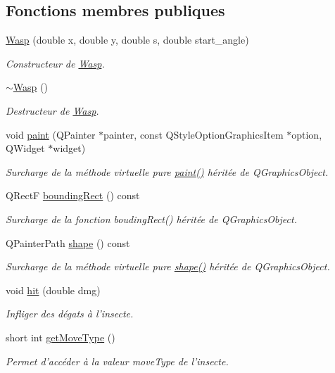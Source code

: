 \subsection*{Fonctions membres publiques}
\begin{DoxyCompactItemize}
\item 
\hyperlink{classWasp_a04c7736d744ab1c36b075f1e98ec93c2}{Wasp} (double x, double y, double s, double start\_\-angle)
\begin{DoxyCompactList}\small\item\em Constructeur de \hyperlink{classWasp}{Wasp}. \end{DoxyCompactList}\item 
\hyperlink{classWasp_ac4b6b3f99b8a044cc2047144f0e44bb1}{$\sim$Wasp} ()
\begin{DoxyCompactList}\small\item\em Destructeur de \hyperlink{classWasp}{Wasp}. \end{DoxyCompactList}\item 
void \hyperlink{classWasp_ac37833715ac95ea82a89c5cbd0fa26fb}{paint} (QPainter $\ast$painter, const QStyleOptionGraphicsItem $\ast$option, QWidget $\ast$widget)
\begin{DoxyCompactList}\small\item\em Surcharge de la méthode virtuelle pure \hyperlink{classWasp_ac37833715ac95ea82a89c5cbd0fa26fb}{paint()} héritée de QGraphicsObject. \end{DoxyCompactList}\item 
QRectF \hyperlink{classBug_a9b39c25361faad07b1bf2dd927d09dab}{boundingRect} () const 
\begin{DoxyCompactList}\small\item\em Surcharge de la fonction boudingRect() héritée de QGraphicsObject. \end{DoxyCompactList}\item 
QPainterPath \hyperlink{classBug_a587a36d3145c2b4dba6c689af22c65ac}{shape} () const 
\begin{DoxyCompactList}\small\item\em Surcharge de la méthode virtuelle pure \hyperlink{classBug_a587a36d3145c2b4dba6c689af22c65ac}{shape()} héritée de QGraphicsObject. \end{DoxyCompactList}\item 
void \hyperlink{classBug_a63402c05b5ba3fb034e41f1ced0e4b9f}{hit} (double dmg)
\begin{DoxyCompactList}\small\item\em Infliger des dégats à l'insecte. \end{DoxyCompactList}\item 
short int \hyperlink{classBug_aced471cedcfa855baddf4c827003e755}{getMoveType} ()
\begin{DoxyCompactList}\small\item\em Permet d'accéder à la valeur moveType de l'insecte. \end{DoxyCompactList}\end{DoxyCompactItemize}
